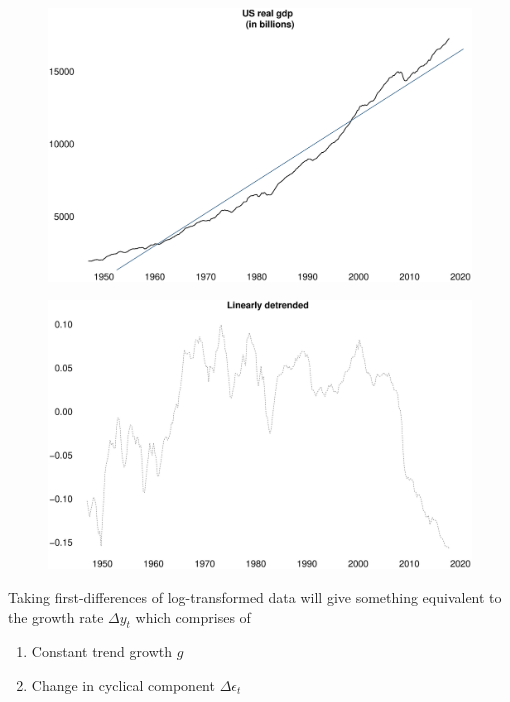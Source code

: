 \documentclass{beamer}
\begin{document}
\begin{frame}
  \begin{figure}
    \includegraphics[scale=.3]{log_linear.eps}
  \end{figure}
\end{frame}

\begin{frame}
  \begin{figure}
    \includegraphics[scale=.3]{loglin_errors.eps}
  \end{figure}
\end{frame}

\begin{frame}
  Taking first-differences of log-transformed data will give something equivalent to the growth rate $\Delta y_t$ which comprises of
  \begin{enumerate}
    \item Constant trend growth $g$
    \item Change in cyclical component $\Delta \epsilon_t$
  \end{enumerate}
\end{frame}
\end{document}
